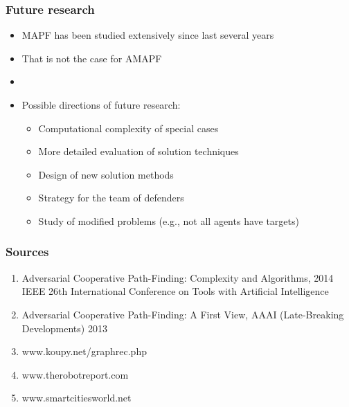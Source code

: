 \documentclass[aspectratio=169,t,xcolor=table]{beamer}
\begin{document}
\begin{frame}
\frametitle{Future research}
\begin{itemize}
    \item[] MAPF has been studied extensively since last several years
    \item[] That is not the case for AMAPF
    \item[] 
    \item[] Possible directions of future research:
    
        \begin{itemize}
        \item Computational complexity of special cases
        \item More detailed evaluation of solution techniques
        \item Design of new solution methods
        \item Strategy for the team of defenders
	\item Study of modified problems (e.g., not all agents have targets)
        \end{itemize}
\end{itemize}
\end{frame}
\begin{frame}
	\frametitle{Sources}
	\begin{enumerate}
		\item Adversarial Cooperative Path-Finding: Complexity and Algorithms, 2014 IEEE 26th International Conference on Tools with Artificial Intelligence
		\item Adversarial Cooperative Path-Finding: A First View, AAAI (Late-Breaking Developments) 2013
		\item www.koupy.net/graphrec.php
		\item www.therobotreport.com
		\item www.smartcitiesworld.net
	\end{enumerate}

\end{frame}
\end{document}
